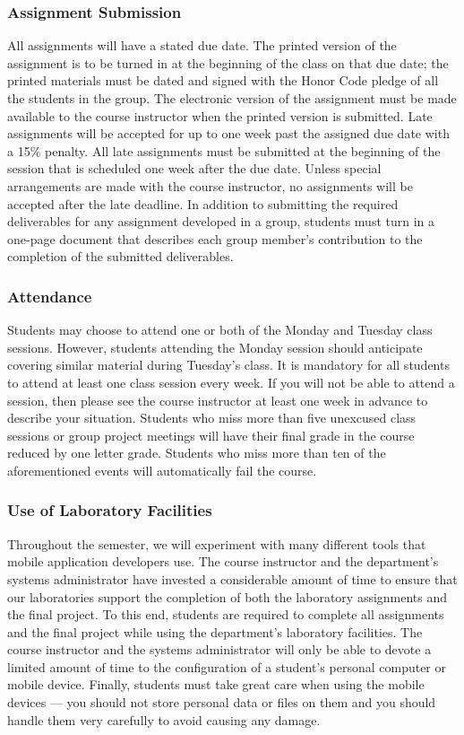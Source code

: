 \subsubsection*{Assignment Submission}

All assignments will have a stated due date. The printed version of the assignment is to be turned in at the beginning
of the class on that due date; the printed materials must be dated and signed with the Honor Code pledge of all the
students in the group.  The electronic version of the assignment must be made available to the course instructor when
the printed version is submitted. Late assignments will be accepted for up to one week past the assigned due date with a
15\% penalty. All late assignments must be submitted at the beginning of the session that is scheduled one week after
the due date. Unless special arrangements are made with the course instructor, no assignments will be accepted after the
late deadline. In addition to submitting the required deliverables for any assignment developed in a group, students must
turn in a one-page document that describes each group member's contribution to the completion of the submitted deliverables.  

\subsubsection*{Attendance}

Students may choose to attend one or both of the Monday and Tuesday class sessions.  However, students attending the
Monday session should anticipate covering similar material during Tuesday's class.  It is mandatory for all students to
attend at least one class session every week. If you will not be able to attend a session, then please see the course
instructor at least one week in advance to describe your situation.  Students who miss more than five unexcused class
sessions or group project meetings will have their final grade in the course reduced by one letter grade.  Students who
miss more than ten of the aforementioned events will automatically fail the course.

\subsubsection*{Use of Laboratory Facilities}

Throughout the semester, we will experiment with many different tools that mobile application developers use.  The
course instructor and the department's systems administrator have invested a considerable amount of time to ensure that
our laboratories support the completion of both the laboratory assignments and the final project.  To this end, students
are required to complete all assignments and the final project while using the department's laboratory facilities. The
course instructor and the systems administrator will only be able to devote a limited amount of time to the
configuration of a student's personal computer or mobile device. Finally, students must take great care when using the
mobile devices --- you should not store personal data or files on them and you should handle them very carefully to avoid
causing any damage.

